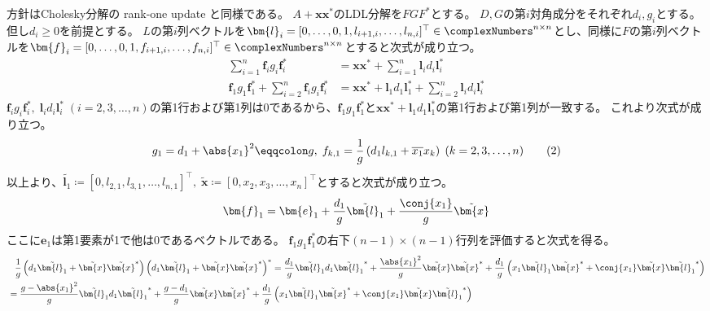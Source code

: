         \begin{derivation*}
            方針はCholesky分解の rank-one update と同様である。
            $A+\bm{x}\bm{x}^*$のLDL分解を$FGF^*$とする。
            $D,G$の第$i$対角成分をそれぞれ$d_i,g_i$とする。
            但し$d_i\geq 0$を前提とする。
            $L$の第$i$列ベクトルを$\bm{l}_i = [0,\dots,0,1,l_{i+1,i},\dots,l_{n,i}]^\top\in\complexNumbers^{n\times n}$とし、同様に$F$の第$i$列ベクトルを$\bm{f}_i = [0,\dots,0,1,f_{i+1,i},\dots,f_{n,i}]^\top\in\complexNumbers^{n\times n}$とすると次式が成り立つ。
            \begin{align*}
                \sum_{i=1}^n \bm{f}_i g_i\bm{f}_i^* &= \bm{x}\bm{x}^* + \sum_{i=1}^n \bm{l}_i d_i\bm{l}_i^* \\
                \bm{f}_1 g_1\bm{f}_1^* + \sum_{i=2}^n \bm{f}_i g_i\bm{f}_i^* &= \bm{x}\bm{x}^* + \bm{l}_1 d_1\bm{l}_1^* + \sum_{i=2}^n \bm{l}_i d_i\bm{l}_i^* \tag{1}
            \end{align*}
            $\bm{f}_i g_i\bm{f}_i^*,\;\bm{l}_i d_i\bm{l}_i^*\;(i=2,3,\dots,n)$の第1行および第1列は0であるから、$\bm{f}_1 g_1\bm{f}_1^*$と$\bm{x}\bm{x}^* + \bm{l}_1 d_1\bm{l}_1^*$の第1行および第1列が一致する。
            これより次式が成り立つ。
            \[ g_1 = d_1 + \abs{x_1}^2 \eqqcolon g,\; f_{k,1} = \frac{1}{g}\left(d_1 l_{k,1} + \overline{x_1}x_k\right) \; (k=2,3,\dots,n) \tag{2} \]
            以上より、$\tilde{\bm{l}_1} \coloneqq [0,l_{2,1},l_{3,1},\dots,l_{n,1}]^\top,\;\tilde{\bm{x}} \coloneqq [0,x_2,x_3,\dots,x_n]^\top$とすると次式が成り立つ。
            \[ \bm{f}_1 = \bm{e}_1 + \frac{d_1}{g}\tilde{\bm{l}_1} + \frac{\conj{x_1}}{g}\tilde{\bm{x}} \]
            ここに$\bm{e}_1$は第1要素が1で他は0であるベクトルである。
            $\bm{f}_1 g_1\bm{f}_1^*$の右下$(n-1)\times(n-1)$行列を評価すると次式を得る。
            \begin{align*}
                &\phantom{=} \frac{1}{g}\left(d_1\tilde{\bm{l}_1} + \tilde{\bm{x}}\tilde{\bm{x}}^*\right)\left(d_1\tilde{\bm{l}_1} + \tilde{\bm{x}}\tilde{\bm{x}}^*\right)^* = \frac{d_1}{g}\tilde{\bm{l}_1}d_1\tilde{\bm{l}_1}^* + \frac{\abs{x_1}^2}{g}\tilde{\bm{x}}\tilde{\bm{x}}^* + \frac{d_1}{g}\left(x_1\tilde{\bm{l}_1}\tilde{\bm{x}}^* + \conj{x_1}\tilde{\bm{x}}\tilde{\bm{l}_1}^*\right) \\
                &= \frac{g - \abs{x_1}^2}{g}\tilde{\bm{l}_1}d_1\tilde{\bm{l}_1}^* + \frac{g-d_1}{g}\tilde{\bm{x}}\tilde{\bm{x}}^* + \frac{d_1}{g}\left(x_1\tilde{\bm{l}_1}\tilde{\bm{x}}^* + \conj{x_1}\tilde{\bm{x}}\tilde{\bm{l}_1}^*\right) \\

\end{align*}
\end{derivation*}
